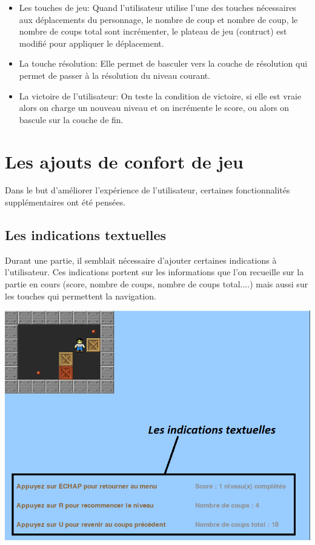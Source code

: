 \documentclass[a4paper,12pt]{article} %
\begin{document}
\begin{itemize}
	\item Les touches de jeu: Quand l'utilisateur utilise l'une des touches nécessaires aux déplacements du personnage, le nombre de coup et nombre de coup, le nombre de coups total sont incrémenter, le plateau de jeu (contruct) est modifié pour appliquer le déplacement.
	\item La touche résolution: Elle permet de basculer vers la couche de résolution qui permet de passer à la résolution du niveau courant.
	\item La victoire de l'utilisateur: On teste la condition de victoire, si elle est vraie alors on charge un nouveau niveau et on incrémente le score, ou alors on bascule sur la couche de fin.
\end{itemize}
\section{Les ajouts de confort de jeu}
Dans le but d'améliorer l'expérience de l'utilisateur, certaines fonctionnalités supplémentaires ont été pensées.

\subsection{Les indications textuelles}
Durant une partie, il semblait nécessaire d'ajouter certaines indications à l'utilisateur. Ces indications portent sur les informations que l'on recueille sur la partie en cours (score, nombre de coups, nombre de coups total....) mais aussi sur les touches qui permettent la navigation.
\begin{center}
	\includegraphics[scale=0.40]{images/Capture_102254.png}
\end{center}
\end{document}
